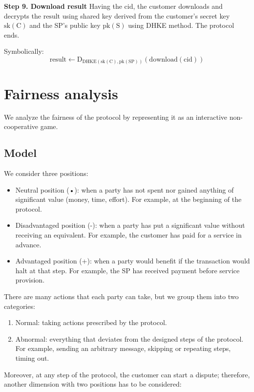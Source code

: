 \documentclass{ieeeaccess}
\begin{document}
\noindent \textbf
{Step 9. Download result}\label{step-9-download-result} 
Having the $\mathrm{cid}$, the customer downloads and decrypts the $\mathrm{result}$ using shared key derived from the customer's secret key $\mathrm{sk(C)}$ and the SP's public key $\mathrm{pk(S)}$ using DHKE method. The protocol ends.

Symbolically: 
\[
\mathrm{result \gets D_{DHKE(sk(C), pk(SP))}(download(cid))}
\]

\section{Fairness analysis}\label{sec:fairness-analysis}
We analyze the fairness of the protocol by representing it as an interactive non-cooperative game.

\subsection{Model}\label{sec:fairness-model}
We consider three positions:

\begin{itemize}
\item Neutral position (•): when a party has not spent nor gained anything of significant value (money, time, effort). For example, at the beginning of the protocol.
\item Disadvantaged position (-): when a party has put a significant value without receiving an equivalent. For example, the customer has paid for a service in advance.
\item Advantaged position (+): when a party would benefit if the transaction would halt at that step. For example, the SP has received payment before service provision.
\end{itemize}

There are many actions that each party can take, but we group them into two categories:

\begin{enumerate}
\def\labelenumi{\arabic{enumi}.}

\item Normal: taking actions prescribed by the protocol.
\item Abnormal: everything that deviates from the designed steps of the protocol. For example, sending an arbitrary message, skipping or repeating steps, timing out.
\end{enumerate}

Moreover, at any step of the protocol, the customer can start a dispute; therefore, another dimension with two positions has to be considered:
\end{document}
